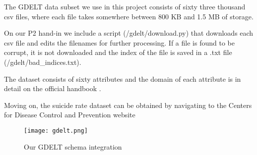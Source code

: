 The GDELT data subset we use in this project consists of sixty
three thousand csv files, where each file takes somewhere between
800 KB and 1.5 MB of storage.

On our P2 hand-in we include a script
(/gdelt/download.py) that downloads each csv file
and edits the filenames for further processing.
If a file is found to be corrupt, it is not downloaded and
the index of the file is saved in a .txt file
(/gdelt/bad\_indices.txt).

The dataset consists of sixty attributes and the domain of
each attribute is in detail on the official handbook
{\color{red}{citation}}.
\cite{suicide_website}

Moving on, the suicide rate dataset can be obtained by
navigating to the Centers for Disease Control and Prevention
website

\begin{figure}
	\centering
	\texttt{[image: gdelt.png]}
	\caption{Our GDELT schema integration}
	\label{fig:gdelt}
\end{figure}
